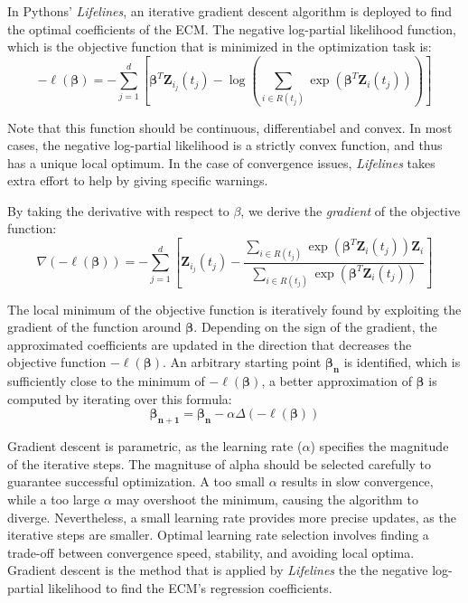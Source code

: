 In Pythons' \textit{Lifelines}, an iterative gradient descent algorithm is deployed to find the optimal coefficients of the ECM. The negative log-partial likelihood function, which is the objective function that is minimized in the optimization task is: 
$$-\ell(\boldsymbol{\beta}) = - \sum_{j=1}^{d} \left[ \boldsymbol{\beta}^T \mathbf{Z}_{i_j}(t_j) - \log\left(\sum_{i \in R(t_j)} \exp(\boldsymbol{\beta}^T \mathbf{Z}_{i}(t_j))\right) \right]$$ %

Note that this function should be continuous, differentiabel and convex. In most cases, the negative log-partial likelihood is a strictly convex function, and thus has a unique local optimum. In the case of convergence issues, \textit{Lifelines} takes extra effort to help by giving specific warnings. 

By taking the derivative with respect to $\beta$, we derive the \textit{gradient} of the objective function:
$$ \nabla (-\ell(\boldsymbol{\beta})) = - \sum_{j=1}^{d} \left[\mathbf{Z}_{i_j}(t_j) - \frac{\sum_{i \in R(t_j)} \exp(\boldsymbol{\beta}^T \mathbf{Z}_{i}(t_j))\mathbf{Z}_{i}}{\sum_{i \in R(t_j)} \exp(\boldsymbol{\beta}^T \mathbf{Z}_{i}(t_j))} \right]$$

The local minimum of the objective function is iteratively found by exploiting the gradient of the function around $\boldsymbol{\beta}$. Depending on the sign of the gradient, the approximated coefficients are updated in the direction that decreases the objective function $-\ell(\boldsymbol{\beta})$. An arbitrary starting point $\boldsymbol{\beta_n}$ is identified, which is sufficiently close to the minimum of $-\ell(\boldsymbol{\beta})$, a better approximation of $\boldsymbol{\beta}$ is computed by iterating over this formula: 
$$\boldsymbol{\beta_{n+1}} = \boldsymbol{\beta_n} - \alpha \Delta (-\ell(\boldsymbol{\beta}))$$

Gradient descent is parametric, as the learning rate ($\alpha$) specifies the magnitude of the iterative steps. The magnituse of alpha should be selected carefully to guarantee successful optimization. A too small $\alpha$ results in slow convergence, while a too large $\alpha$ may overshoot the minimum, causing the algorithm to diverge. Nevertheless, a small learning rate provides more precise updates, as the iterative steps are smaller. Optimal learning rate selection involves finding a trade-off between convergence speed, stability, and avoiding local optima.
Gradient descent is the method that is applied by \textit{Lifelines} the the negative log-partial likelihood to find the ECM's regression coefficients. %


